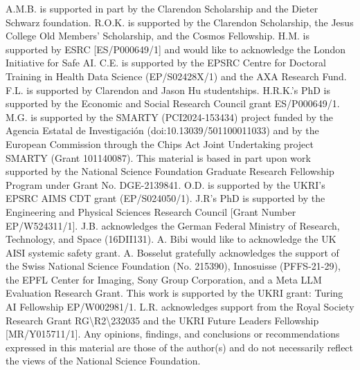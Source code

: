 \documentclass[tikz]{article}
\begin{document}
\begin{refsection}







\begin{ack}
A.M.B. is supported in part by the Clarendon Scholarship and the Dieter Schwarz foundation. R.O.K. is supported by the Clarendon Scholarship, the Jesus College Old Members' Scholarship, and the Cosmos Fellowship. H.M. is supported by ESRC [ES/P000649/1] and would like to acknowledge the London Initiative for Safe AI. C.E. is supported by the EPSRC Centre for Doctoral Training in Health Data Science (EP/S02428X/1) and the AXA Research Fund. F.L. is supported by Clarendon and Jason Hu studentships. H.R.K.’s PhD is supported by the Economic and Social Research Council grant ES/P000649/1. M.G. is supported by the SMARTY (PCI2024-153434) project funded by the Agencia Estatal de Investigación (doi:10.13039/501100011033) and by the European Commission through the Chips Act Joint Undertaking project SMARTY (Grant 101140087). This material is based in part upon work supported by the National Science Foundation Graduate Research Fellowship Program under Grant No. DGE-2139841. O.D. is supported by the UKRI’s EPSRC AIMS CDT grant (EP/S024050/1). J.R's PhD is supported by the Engineering and Physical Sciences Research Council [Grant Number EP/W524311/1]. J.B. acknowledges the German Federal Ministry of Research, Technology, and Space (16DII131). A. Bibi would like to acknowledge the UK AISI systemic safety grant. A. Bosselut gratefully acknowledges the support of the Swiss National Science Foundation (No. 215390), Innosuisse (PFFS-21-29), the EPFL Center for Imaging, Sony Group Corporation, and a Meta LLM Evaluation Research Grant. This work is supported by the UKRI grant: Turing AI Fellowship EP/W002981/1. L.R. acknowledges support from the Royal Society Research Grant RG{\textbackslash}R2{\textbackslash}232035 and the UKRI Future Leaders Fellowship [MR/Y015711/1]. Any opinions, findings, and conclusions or recommendations expressed in this material are those of the author(s) and do not necessarily reflect the views of the National Science Foundation.
\end{ack}

\clearpage
%
\printbibliography
\end{refsection} 


\appendix
\begin{refsection}

%
%



% 





\printbibliography[title={Additional Reviewed Papers}]
\end{refsection}
\clearpage
\end{document}
